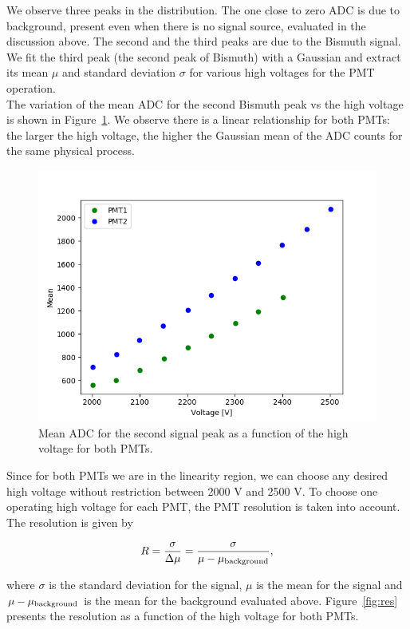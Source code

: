 \documentclass[10pt,swedish, openany]{book}
\begin{document}
We observe three peaks in the distribution. The one close to zero ADC is due to background, present even when there is no signal source, evaluated in the discussion above. The second and the third peaks are due to the Bismuth signal. We fit the third peak (the second peak of Bismuth) with a Gaussian and extract its mean $\mu$ and standard deviation $\sigma$ for various high voltages for the PMT operation. \\ 

The variation of the mean ADC for the second Bismuth peak vs the high voltage is shown in Figure~\ref{fig:mean}. We observe there is a linear relationship for both PMTs: the larger the high voltage, the higher the Gaussian mean of the ADC counts for the same physical process. 

\begin{figure}[H]
\includegraphics[scale=0.6]{mean.png}
\centering
\caption{Mean ADC for the second signal peak as a function of the high voltage for both PMTs.}
\label{fig:mean}
\end{figure}

Since for both PMTs we are in the linearity region, we can choose any desired high voltage without restriction between 2000 V and 2500 V. To choose one operating high voltage for each PMT, the PMT resolution is taken into account.  The resolution is given by

\begin{equation}
    R = \frac{\sigma}{\Delta\mu} =  \frac{\sigma}{\mu - \mu_{\rm background}},
\end{equation}

where $\sigma$ is the standard deviation for the signal, $\mu$ is the mean for the signal and  $\mu - \mu_{\rm background}$ is the mean for the background evaluated above. Figure~\ref{fig:res} presents the resolution as a function of the high voltage for both PMTs.
\end{document}
